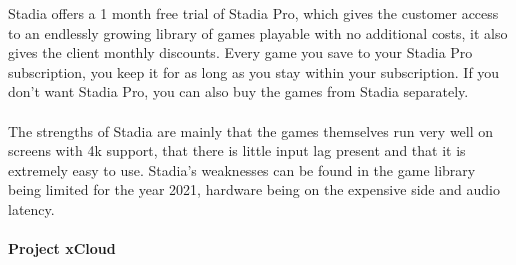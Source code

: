 Stadia offers a 1 month free trial of Stadia Pro, which gives the customer access to an endlessly growing library of games playable with no additional costs, it also gives the client monthly discounts. Every game you save to your Stadia Pro subscription, you keep it for as long as you stay within your subscription. If you don't want Stadia Pro, you can also buy the games from Stadia separately.\\\\
The strengths of Stadia are mainly that the games themselves run very well on screens with 4k support, that there is little input lag present and that it is extremely easy to use. Stadia's weaknesses can be found in the game library being limited for the year 2021, hardware being on the expensive side and audio latency.\\\\
\textbf{Project xCloud}\\\\